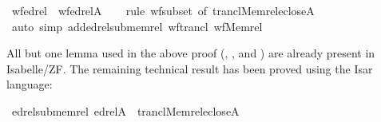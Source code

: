 \begin{isabelle}
\isamarkupfalse%
\ wf{\isacharunderscore}edrel\ {\isacharcolon}\ {\isachardoublequoteopen}wf{\isacharparenleft}edrel{\isacharparenleft}A{\isacharparenright}{\isacharparenright}{\isachardoublequoteclose}\isanewline
\ \ \isamarkupfalse%
\ {\isacharparenleft}rule\ wf{\isacharunderscore}subset\ {\isacharbrackleft}of\ {\isachardoublequoteopen}trancl{\isacharparenleft}Memrel{\isacharparenleft}eclose{\isacharparenleft}A{\isacharparenright}{\isacharparenright}{\isacharparenright}{\isachardoublequoteclose}{\isacharbrackright}{\isacharparenright}\isanewline
\ \ \isamarkupfalse%
\ {\isacharparenleft}auto\ simp\ add{\isacharcolon}edrel{\isacharunderscore}sub{\isacharunderscore}memrel\ wf{\isacharunderscore}trancl\ wf{\isacharunderscore}Memrel{\isacharparenright}\isanewline
\ \ \isamarkupfalse%
%
\end{isabelle}
%
All but one lemma used in the above proof
(,
, and
) are already
present in Isabelle/ZF. The remaining technical result has
been proved using the Isar language:
%
\begin{isabelle}
\isamarkupfalse%
\ edrel{\isacharunderscore}sub{\isacharunderscore}memrel{\isacharcolon}\ {\isachardoublequoteopen}edrel{\isacharparenleft}A{\isacharparenright}\ {\isasymsubseteq}\ trancl{\isacharparenleft}Memrel{\isacharparenleft}eclose{\isacharparenleft}A{\isacharparenright}{\isacharparenright}{\isacharparenright}{\isachardoublequoteclose}
\end{isabelle}

